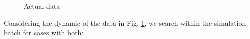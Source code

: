 \documentclass[graybox]{svmult}
\begin{document}
\begin{figure}[t]

 \begin{subfigure}{0.48\textwidth}
 \centering
 \label{actualA}
 \end{subfigure}
 \hfill
 \begin{subfigure}{0.48\textwidth}
 \centering
 \label{actualB}
 \end{subfigure}
 \caption{Actual data}
 \label{actualData}
\end{figure}



Considering the dynamic of the data in Fig. \ref{actualA}, we search within the simulation batch for cases with both:
\end{document}
